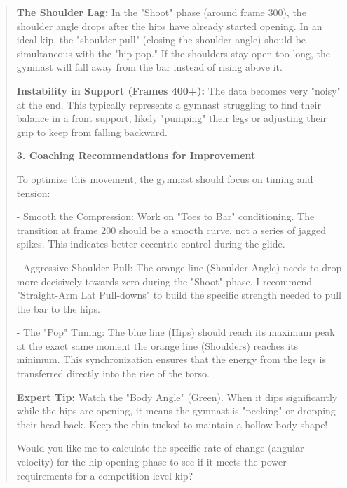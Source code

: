 \begin{quote}
    \textbf{The Shoulder Lag:} In the "Shoot" phase (around frame 300), the shoulder angle drops after the hips have already started opening. In an ideal kip, the "shoulder pull" (closing the shoulder angle) should be simultaneous with the "hip pop." If the shoulders stay open too long, the gymnast will fall away from the bar instead of rising above it.
    
    \textbf{Instability in Support (Frames 400+):} The data becomes very "noisy" at the end. This typically represents a gymnast struggling to find their balance in a front support, likely "pumping" their legs or adjusting their grip to keep from falling backward.
    
    \textbf{3. Coaching Recommendations for Improvement}
    
    To optimize this movement, the gymnast should focus on timing and tension:
    
    - Smooth the Compression: Work on "Toes to Bar" conditioning. The transition at frame 200 should be a smooth curve, not a series of jagged spikes. This indicates better eccentric control during the glide.
    
    - Aggressive Shoulder Pull: The orange line (Shoulder Angle) needs to drop more decisively towards zero during the "Shoot" phase. I recommend "Straight-Arm Lat Pull-downs" to build the specific strength needed to pull the bar to the hips.
    
    - The "Pop" Timing: The blue line (Hips) should reach its maximum peak at the exact same moment the orange line (Shoulders) reaches its minimum. This synchronization ensures that the energy from the legs is transferred directly into the rise of the torso.
    
    \textbf{Expert Tip:} Watch the "Body Angle" (Green). When it dips significantly while the hips are opening, it means the gymnast is "peeking" or dropping their head back. Keep the chin tucked to maintain a hollow body shape!
    
    Would you like me to calculate the specific rate of change (angular velocity) for the hip opening phase to see if it meets the power requirements for a competition-level kip?
\end{quote}